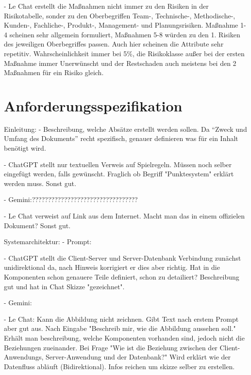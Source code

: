 - Le Chat erstellt die Maßnahmen nicht immer zu den Risiken in der Risikotabelle, sonder zu den Oberbegriffen Team-, Technische-, Methodische-, 
Kunden-, Fachliche-, Produkt-, Management- und Planungsrisiken. Maßnahme 1-4 scheinen sehr allgemein formuliert, Maßnahmen 5-8 würden
zu den 1. Risiken des jeweiligen Oberbegriffes passen. Auch hier scheinen die Attribute sehr repetitiv. Wahrscheinlichkeit immer bei 5\%,
die Risikoklasse außer bei der ersten Maßnahme immer Unerwünscht und der Restschaden auch meistens bei den 2 Maßnahmen für ein Risiko gleich.

\section{Anforderungsspezifikation}  \label{CompAnforderungsspezifikation}

Einleitung:
- Beschreibung, welche Absätze erstellt werden sollen. Da ``Zweck und Umfang des Dokuments'' recht spezifisch, genauer definieren was für ein 
Inhalt benötigt wird.

- ChatGPT stellt nur textuellen Verweis auf Spielregeln. Müssen noch selber eingefügt werden, falls gewünscht. Fraglich ob Begriff "Punktesystem"
erklärt werden muss. Sonst gut.

- Gemini:?????????????????????????????????

- Le Chat verweist auf Link aus dem Internet. Macht man das in einem offizielen Dokument? Sonst gut.


Systemarchitektur:
- Prompt:

- ChatGPT stellt die Client-Server und Server-Datenbank Verbindung zunächst unidirektional da, nach Hinweis korrigiert 
er dies aber richtig. Hat in die Komponenten schon genauere Teile definiert, schon zu detailiert? Beschreibung gut und 
hat in Chat Skizze "gezeichnet".

- Gemini:

- Le Chat: Kann die Abbildung nicht zeichnen. Gibt Text nach erstem Prompt aber gut aus. Nach Eingabe "Beschreib mir, 
wie die Abbildung aussehen soll." Erhält man beschreibung, welche Komponenten vorhanden sind, jedoch nicht die 
Beziehungen zueinander. Bei Frage "Wie ist die Beziehung zwischen der Client-Anwendungs, Server-Anwendung und der 
Datenbank?" Wird erklärt wie der Datenfluss abläuft (Bidirektional). Infos reichen um skizze selber zu erstellen.

